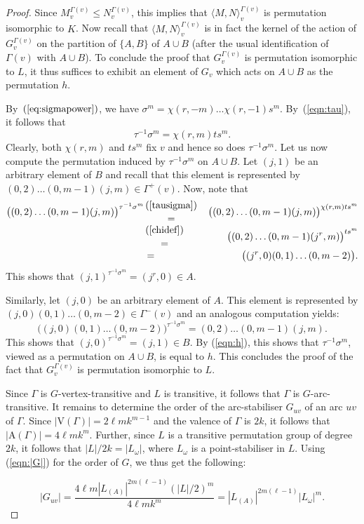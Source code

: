 \documentclass{amsart}
\theoremstyle{definition}
\begin{document}
\begin{proof}
Since $M_v^{\Gamma(v)} \le N_v^{\Gamma(v)}$, this implies that ${\langle} M,N{\rangle}_v^{\Gamma(v)}$ is permutation isomorphic to $K$. Now recall that ${\langle} M,N{\rangle}_v^{\Gamma(v)}$ is in fact the kernel of the action of $G_v^{\Gamma(v)}$ on the partition of $\{A,B\}$ of $A\cup B$ (after the usual identification of $\Gamma(v)$ with $A\cup B$).
 To conclude the proof that $G_v^{\Gamma(v)}$ is permutation isomorphic to $L$, it thus suffices to exhibit an element of $G_v$ which acts on $A\cup B$ as the permutation $h$.

By~$(\ref{eq:sigmapower})$, we have $\sigma^m=\chi(r,-m)\ldots \chi(r,-1)s^m$. By~(\ref{eqn:tau}), it follows that 
\begin{equation}\label{tausigma}
\tau^{-1}\sigma^m=\chi(r,m)ts^m.
\end{equation}
Clearly, both $\chi(r,m)$ and $ts^m$ fix $v$ and hence so does $\tau^{-1}\sigma^m$. Let us now compute the permutation induced by $\tau^{-1}\sigma^m$ on $A \cup B$. Let $(j,1)$ be an arbitrary element of $B$ and recall that this element is represented by $(0,2)\ldots(0,m-1)(j,m)\in\Gamma^+(v)$. Now, note that
\begin{eqnarray*}
\bigl((0,2)\ldots(0,m-1)(j,m)\bigr)^{\tau^{-1}\sigma^m}&(\ref{tausigma})\atop=&\bigl((0,2)\ldots(0,m-1)(j,m)\bigr)^{\chi(r,m)ts^m}\\
&(\ref{chidef})\atop=&\bigl((0,2)\ldots(0,m-1)(j^r,m)\bigr)^{ts^m}\\
&=&\bigl((j^r,0)(0,1)\ldots(0,m-2)\bigr).
\end{eqnarray*} 
This shows that $(j,1)^{\tau^{-1}\sigma^m}=(j^r,0)\in A$.

Similarly,  let $(j,0)$ be an arbitrary element of $A$. This element is represented by $(j,0)(0,1)\ldots(0,m-2)\in\Gamma^-(v)$ and an analogous computation yields:
$$\bigl((j,0)(0,1)\ldots(0,m-2)\bigr)^{\tau^{-1}\sigma^m}=(0,2)\ldots(0,m-1)(j,m).$$
This shows that $(j,0)^{\tau^{-1}\sigma^m}=(j,1)\in B$. By (\ref{eqn:h}), this shows that $\tau^{-1}\sigma^m$, viewed as a permutation on $A\cup B$, is equal to $h$. This concludes the proof of the fact that $G_v^{\Gamma(v)}$ is permutation isomorphic to $L$. 

Since $\Gamma$ is $G$-vertex-transitive and $L$ is transitive, it follows that $\Gamma$ is $G$-arc-transitive. It remains to determine the order of the arc-stabiliser $G_{uv}$ of an arc $uv$ of $\Gamma$. Since $|{\mathrm V}(\Gamma)| = 2\ell m k^{m-1}$ and the valence of $\Gamma$ is $2k$, it follows that $|{\mathrm A}(\Gamma)| = 4\ell m k^{m}$. Further, since $L$ is a transitive permutation group of degree $2k$, it follows that $|L|/2k=|L_\omega|$, where $L_\omega$ is a point-stabiliser in $L$. Using (\ref{eqn:|G|}) for the order of $G$, we thus get the following:

$$|G_{uv}| = \frac{4\ell m  |L_{(A)}|^{2 m (\ell -1)} (|L|/2)^m }{4 \ell mk^{m}} =|L_{(A)}|^{2 m (\ell -1)} |L_\omega|^m.$$
\end{proof}
\end{document}
